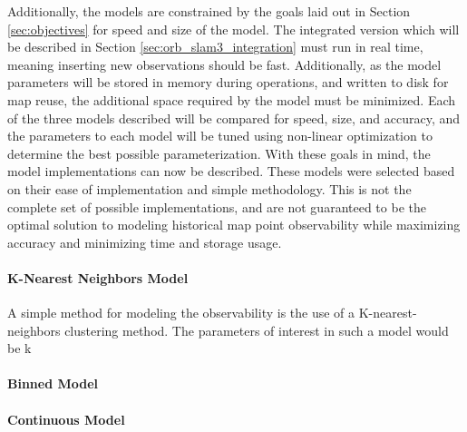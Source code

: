 Additionally, the models are constrained by the goals laid out in Section \ref{sec:objectives} for speed and size of the model. The integrated version which will be described in Section \ref{sec:orb_slam3_integration} must run in real time, meaning inserting new observations should be fast. Additionally, as the model parameters will be stored in memory during operations, and written to disk for map reuse, the additional space required by the model must be minimized. Each of the three models described will be compared for speed, size, and accuracy, and the parameters to each model will be tuned using non-linear optimization to determine the best possible parameterization. With these goals in mind, the model implementations can now be described. These models were selected based on their ease of implementation and simple methodology. This is not the complete set of possible implementations, and are not guaranteed to be the optimal solution to modeling historical map point observability while maximizing accuracy and minimizing time and storage usage.

\paragraph{K-Nearest Neighbors Model}
A simple method for modeling the observability is the use of a K-nearest-neighbors clustering method. The parameters of interest in such a model would be k
\paragraph{Binned Model}
\paragraph{Continuous Model}